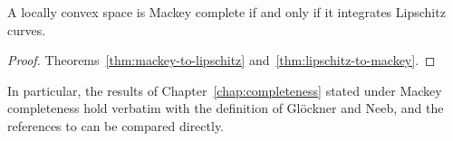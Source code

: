 \begin{corollary}
  \label{cor:mackey-iff}
  \leanok
  A locally convex space is Mackey complete if and only if it integrates Lipschitz curves.
\end{corollary}

\begin{proof}
  \leanok
  Theorems~\ref{thm:mackey-to-lipschitz} and~\ref{thm:lipschitz-to-mackey}.
\end{proof}

In particular, the results of Chapter~\ref{chap:completeness} stated under Mackey completeness
hold verbatim with the definition of Glöckner and Neeb, and the references to \cite{GN26} can be
compared directly.
